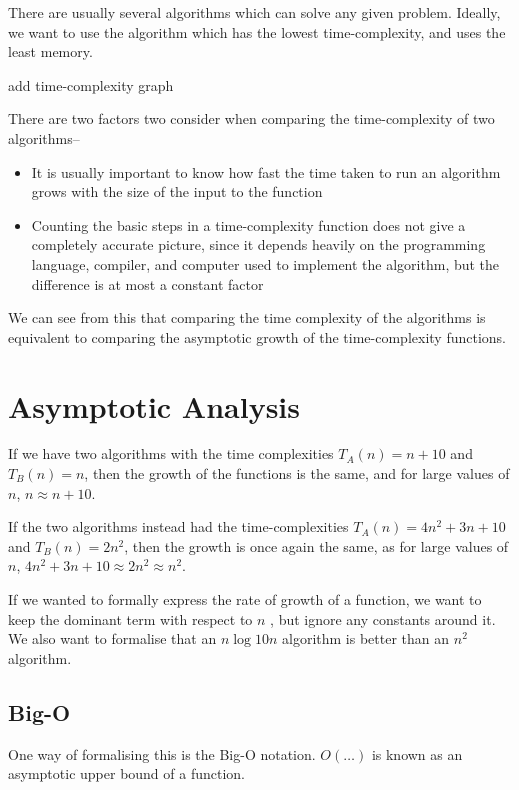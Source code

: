 
There are usually several algorithms which can solve any given problem. Ideally, we want to use the algorithm which
 has the lowest time-complexity, and uses the least memory.

{\huge add time-complexity graph}

There are two factors two consider when comparing the time-complexity of two algorithms--
\begin{itemize}
  \item It is usually important to know how fast the time taken to run an algorithm grows with the size of the input
   to the function
  \item Counting the basic steps in a time-complexity function does not give a completely accurate picture, since it
   depends heavily on the programming language, compiler, and computer used to implement the algorithm, but the
   difference is at most a constant factor
\end{itemize}

We can see from this that comparing the time complexity of the algorithms is equivalent to comparing the asymptotic
 growth of the time-complexity functions.

\section*{Asymptotic Analysis}

If we have two algorithms with the time complexities $T_A(n) = n + 10$ and $T_B(n) = n$, then the growth of the
 functions is the same, and for large values of $n$, $n \approx n + 10$.

If the two algorithms instead had the time-complexities $T_A(n) = 4n^2 + 3n + 10$ and $T_B(n) = 2n^2$, then the growth
 is once again the same, as for large values of $n$, $4n^2 + 3n + 10 \approx 2n^2 \approx n^2$.

If we wanted to formally express the rate of growth of a function, we want to keep the dominant term with respect to $n$
, but ignore any constants around it. We also want to formalise that an $n \log{10}{n}$ algorithm is better than an
 $n^2$ algorithm.

\subsection*{Big-O}

One way of formalising this is the Big-O notation. $O(\ldots)$ is known as an asymptotic upper bound of a function.

